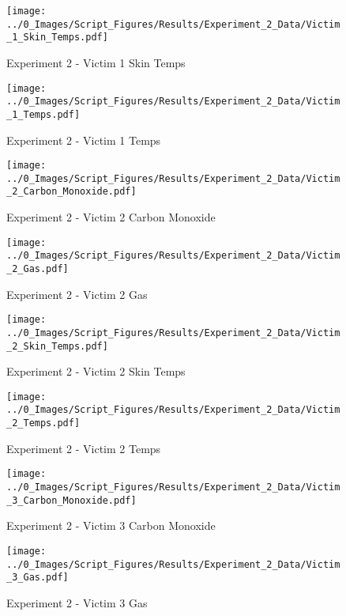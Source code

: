 	\begin{figure}[H]
		\centering
		\texttt{[image: ../0\_Images/Script\_Figures/Results/Experiment\_2\_Data/Victim\_1\_Skin\_Temps.pdf]}
		\caption[]{Experiment 2 - Victim 1 Skin Temps}
	\end{figure}
 
	\clearpage

	\begin{figure}[H]
		\centering
		\texttt{[image: ../0\_Images/Script\_Figures/Results/Experiment\_2\_Data/Victim\_1\_Temps.pdf]}
		\caption[]{Experiment 2 - Victim 1 Temps}
	\end{figure}
 

	\begin{figure}[H]
		\centering
		\texttt{[image: ../0\_Images/Script\_Figures/Results/Experiment\_2\_Data/Victim\_2\_Carbon\_Monoxide.pdf]}
		\caption[]{Experiment 2 - Victim 2 Carbon Monoxide}
	\end{figure}
 
	\clearpage

	\begin{figure}[H]
		\centering
		\texttt{[image: ../0\_Images/Script\_Figures/Results/Experiment\_2\_Data/Victim\_2\_Gas.pdf]}
		\caption[]{Experiment 2 - Victim 2 Gas}
	\end{figure}
 

	\begin{figure}[H]
		\centering
		\texttt{[image: ../0\_Images/Script\_Figures/Results/Experiment\_2\_Data/Victim\_2\_Skin\_Temps.pdf]}
		\caption[]{Experiment 2 - Victim 2 Skin Temps}
	\end{figure}
 
	\clearpage

	\begin{figure}[H]
		\centering
		\texttt{[image: ../0\_Images/Script\_Figures/Results/Experiment\_2\_Data/Victim\_2\_Temps.pdf]}
		\caption[]{Experiment 2 - Victim 2 Temps}
	\end{figure}
 

	\begin{figure}[H]
		\centering
		\texttt{[image: ../0\_Images/Script\_Figures/Results/Experiment\_2\_Data/Victim\_3\_Carbon\_Monoxide.pdf]}
		\caption[]{Experiment 2 - Victim 3 Carbon Monoxide}
	\end{figure}
 
	\clearpage

	\begin{figure}[H]
		\centering
		\texttt{[image: ../0\_Images/Script\_Figures/Results/Experiment\_2\_Data/Victim\_3\_Gas.pdf]}
		\caption[]{Experiment 2 - Victim 3 Gas}
	\end{figure}
 

